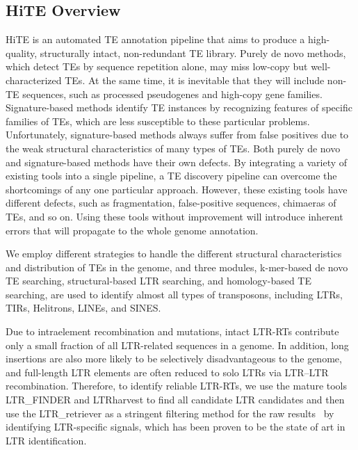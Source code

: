 \documentclass{bmcart}
\begin{document}
\subsection*{HiTE Overview}
HiTE is an automated TE annotation pipeline that aims to produce a high-quality, structurally intact, non-redundant TE library. Purely de novo methods, which detect TEs by sequence repetition alone, may miss low-copy but well-characterized TEs. At the same time, it is inevitable that they will include non-TE sequences, such as processed pseudogenes and high-copy gene families. Signature-based methods identify TE instances by recognizing features of specific families of TEs, which are less susceptible to these particular problems. Unfortunately, signature-based methods always suffer from false positives due to the weak structural characteristics of many types of TEs. Both purely de novo and signature-based methods have their own defects. By integrating a variety of existing tools into a single pipeline, a TE discovery pipeline can overcome the shortcomings of any one particular approach. However, these existing tools have different defects, such as fragmentation, false-positive sequences, chimaeras of TEs, and so on. Using these tools without improvement will introduce inherent errors that will propagate to the whole genome annotation.

We employ different strategies to handle the different structural characteristics and distribution of TEs in the genome, and three modules, k-mer-based de novo TE searching, structural-based LTR searching, and homology-based TE searching, are used to identify almost all types of transposons, including LTRs, TIRs, Helitrons, LINEs, and SINES.

Due to intraelement recombination and mutations, intact LTR-RTs contribute only a small fraction of all LTR-related sequences in a genome\cite{ou2018ltr_retriever}. In addition, long insertions are also more likely to be selectively disadvantageous to the genome, and full-length LTR elements are often reduced to solo LTRs via LTR–LTR recombination\cite{storer2022methodologies}. Therefore, to identify reliable LTR-RTs, we use the mature tools LTR\_FINDER\cite{xu2007ltr_finder} and LTRharvest\cite{ellinghaus2008ltrharvest} to find all candidate LTR candidates and then use the LTR\_retriever\cite{ou2018ltr_retriever} as a stringent filtering method for the raw results  by identifying LTR-specific signals, which has been proven to be the state of art in LTR identification.
\end{document}
